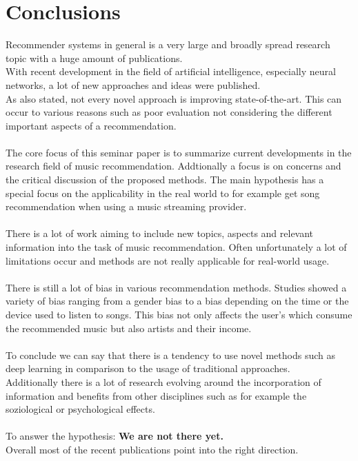 \documentclass[runningheads,a4paper]{llncs}
\begin{document}
\section{Conclusions}
Recommender systems in general is a very large and broadly spread research topic with a huge amount of publications.\\
With recent development in the field of artificial intelligence, especially neural networks, a lot of new approaches and ideas were published.\\
As also \cite{cremonesi2021progress} stated, not every novel approach is improving state-of-the-art. This can occur to various reasons such as poor evaluation not considering the different important aspects of a recommendation.\\
\\
The core focus of this seminar paper is to summarize current developments in the research field of music recommendation. 
Addtionally a focus is on concerns and the critical discussion of the proposed methods. The main hypothesis has a special focus on the 
applicability in the real world to for example get song recommendation when using a music streaming provider.\\
\\
There is a lot of work aiming to include new topics, aspects and relevant information into the task of music recommendation. 
Often unfortunately a lot of limitations occur and methods are not really applicable for real-world usage. \\
\\
There is still a lot of bias in various recommendation methods. Studies showed a variety of bias ranging from a gender bias to a bias depending on the time or the device used to listen to songs. This bias not only 
affects the user's which consume the recommended music but also artists and their income. \\
\\
To conclude we can say that there is a tendency to use novel methods such as deep learning in comparison to the usage of traditional approaches.\\
Additionally there is a lot of research evolving around the incorporation of information and benefits from other disciplines such as 
for example the soziological or psychological effects. \\
\\
To answer the hypothesis: 
\textbf{We are not there yet.} \\
Overall most of the recent publications point into the right direction.  
\end{document}
